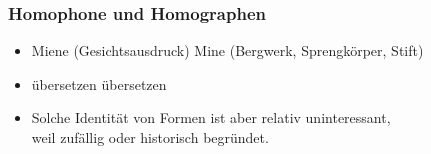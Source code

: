 

\begin{frame}
\frametitle{Homophone und Homographen}
  \begin{itemize}
  \item {}
\eal
\ex Miene (Gesichtsausdruck) 
\ex Mine (Bergwerk, Sprengkörper, Stift) 
\zl
\pause
\item {} 
\eal 
\ex übers\textprimstress etzen 
\ex \textprimstress übersetzen
\zl
\pause
\item Solche Identität von Formen ist aber relativ uninteressant,\\
      weil zufällig oder historisch begründet.
  \end{itemize}
\end{frame}


